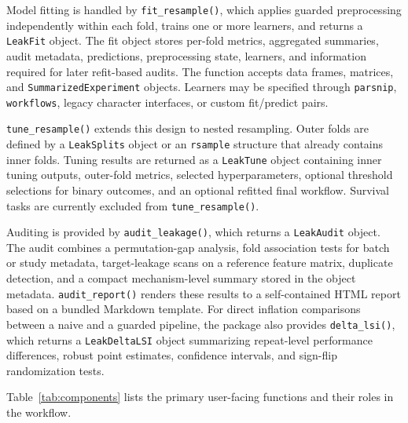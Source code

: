 \documentclass[article]{jss}
\begin{document}
Model fitting is handled by \texttt{fit\_resample()}, which applies guarded
preprocessing independently within each fold, trains one or more learners, and
returns a \texttt{LeakFit} object. The fit object stores per-fold metrics,
aggregated summaries, audit metadata, predictions, preprocessing state,
learners, and information required for later refit-based audits. The function
accepts data frames, matrices, and \texttt{SummarizedExperiment} objects.
Learners may be specified through \texttt{parsnip}, \texttt{workflows}, legacy
character interfaces, or custom fit/predict pairs.

\texttt{tune\_resample()} extends this design to nested resampling. Outer folds
are defined by a \texttt{LeakSplits} object or an \texttt{rsample} structure
that already contains inner folds. Tuning results are returned as a
\texttt{LeakTune} object containing inner tuning outputs, outer-fold metrics,
selected hyperparameters, optional threshold selections for binary outcomes, and
an optional refitted final workflow. Survival tasks are currently excluded from
\texttt{tune\_resample()}.

Auditing is provided by \texttt{audit\_leakage()}, which returns a
\texttt{LeakAudit} object. The audit combines a permutation-gap analysis, fold
association tests for batch or study metadata, target-leakage scans on a
reference feature matrix, duplicate detection, and a compact mechanism-level
summary stored in the object metadata. \texttt{audit\_report()} renders these
results to a self-contained HTML report based on a bundled  Markdown template.
For direct inflation comparisons between a naive and a guarded pipeline, the
package also provides \texttt{delta\_lsi()}, which returns a
\texttt{LeakDeltaLSI} object summarizing repeat-level performance differences,
robust point estimates, confidence intervals, and sign-flip randomization
tests.

Table~\ref{tab:components} lists the primary user-facing functions and their
roles in the workflow.
\end{document}
